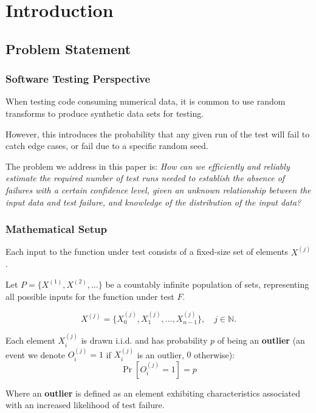 \section{Introduction}

\subsection{Problem Statement}

\subsubsection{Software Testing Perspective}

When testing code consuming numerical data, it is common to use random transforms to produce synthetic data sets for testing.

However, this introduces the probability that any given run of the test will fail to catch edge cases, or fail due to a specific random seed.

The problem we address in this paper is: \textit{How can we efficiently and reliably estimate the required number of test runs needed to establish the absence of failures with a certain confidence level, given an unknown relationship between the input data and test failure, and knowledge of the distribution of the input data?}

\subsubsection{Mathematical Setup}


    Each input to the function under test consists of a fixed-size set of elements $X^{(j)}$.

    Let $P = \{ X^{(1)}, X^{(2)}, \dots \}$ be a countably infinite population of sets, representing all possible inputs for the function under test $F$. 
    
    \[
        X^{(j)} = \{ X_0^{(j)}, X_1^{(j)}, \dots, X_{n-1}^{(j)} \}, \quad j \in \mathbb{N}.
    \]

    Each element $X_i^{(j)}$ is drawn i.i.d. and has probability $p$ of being an \textbf{outlier} (an event we denote $O_i^{(j)} = 1$ if $X_i^{(j)}$ is an outlier, $0$ otherwise):
    \[
        \Pr[ O_i^{(j)} = 1 ] = p
    \]

    Where an \textbf{outlier} is defined as an element exhibiting characteristics associated with an increased likelihood of test failure.

